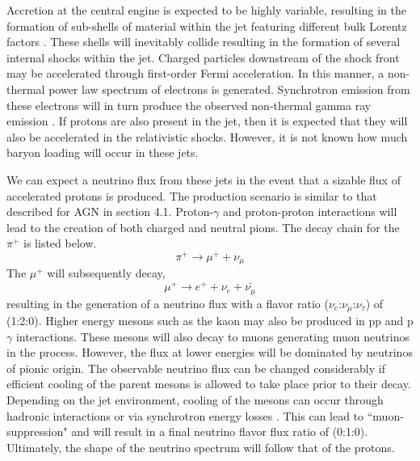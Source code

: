 \documentclass{gatech-thesis}
\begin{document}
Accretion at the central engine is expected to be highly variable, resulting in the formation of sub-shells of material within the jet featuring different bulk Lorentz factors \cite{2014arXiv1410.0679K}. These shells will inevitably collide resulting in the formation of several internal shocks within the jet. Charged particles downstream of the shock front may be accelerated through first-order Fermi acceleration. In this manner, a non-thermal power law spectrum of electrons is generated. Synchrotron emission from these electrons will in turn produce the observed non-thermal gamma ray emission \cite{1996ApJ...461L..37B}. If protons are also present in the jet, then it is expected that they will also be accelerated in the relativistic shocks. However, it is not known how much baryon loading will occur in these jets.

We can expect a neutrino flux from these jets in the event that a sizable flux of accelerated protons is produced. The production scenario is similar to that described for AGN in section 4.1. Proton-$\gamma$ and proton-proton interactions will lead to the creation of both charged and neutral pions. The decay chain for the $\pi^+$ is listed below.
\begin{equation}\label{eq:pidecay}
\pi^{+} \rightarrow \mu^{+} + \nu_{\mu}
\end{equation}
The $\mu^+$ will subsequently decay,
\begin{equation}
\mu^+ \rightarrow e^+ + \nu_e + \bar{\nu_{\mu}}
\end{equation}
resulting in the generation of a neutrino flux with a flavor ratio ($\nu_e$:$\nu_{\mu}$:$\nu_{\tau}$) of (1:2:0). Higher energy mesons such as the kaon may also be produced in pp and p$\gamma$ interactions. These mesons will also decay to muons generating muon neutrinos in the process. However, the flux at lower energies will be dominated by neutrinos of pionic origin. The observable neutrino flux can be changed considerably if efficient cooling of the parent mesons is allowed to take place prior to their decay. Depending on the jet environment, cooling of the mesons can occur through hadronic interactions or via synchrotron energy losses \cite{2005PhRvL..95f1103A}. This can lead to ``muon-suppression" and will result in a final neutrino flavor flux ratio of (0:1:0). Ultimately, the shape of the neutrino spectrum will follow that of the protons.
\end{document}
